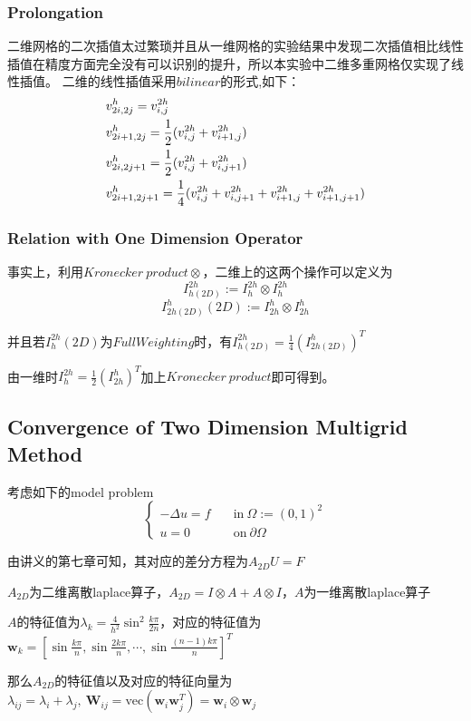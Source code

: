 \documentclass{article}
\begin{document}
\subsubsection{Prolongation}
二维网格的二次插值太过繁琐并且从一维网格的实验结果中发现二次插值相比线性插值在精度方面完全没有可以识别的提升，所以本实验中二维多重网格仅实现了线性插值。
二维的线性插值采用$bilinear$的形式,如下：
\begin{align}
    & v_{2i,2j}^h = v_{i,j}^{2h} \notag \\
    & v_{2i+1,2j}^h=\frac{1}{2}(v_{i,j}^{2h}+v_{i+1,j}^{2h})\notag\\
    & v_{2i,2j+1}^h=\frac{1}{2}(v_{i,j}^{2h}+v_{i,j+1}^{2h})\notag\\
    & v_{2i+1,2j+1}^h=\frac{1}{4}(v_{i,j}^{2h}+v_{i,j+1}^{2h}+v_{i+1,j}^{2h}+v_{i+1,j+1}^{2h})\notag
\end{align}

\subsubsection{Relation with One Dimension Operator}
事实上，利用$Kronecker\ product\otimes$，二维上的这两个操作可以定义为
$$I_{h(2D)}^{2h} := I_h^{2h}\otimes I_h^{2h} $$
$$I_{2h(2D)}^{h}(2D) := I_{2h}^{h}\otimes I_{2h}^{h} $$

并且若$I_h^{2h}(2D)$为$Full Weighting$时，有$I_{h(2D)}^{2h}=\frac{1}{4}(I_{2h(2D)}^{h})^T$

由一维时$I_h^{2h}=\frac{1}{2}(I_{2h}^{h})^T$加上$Kronecker\ product$即可得到。

\subsection{Convergence of Two Dimension Multigrid Method}
考虑如下的model problem
$$
\begin{cases}
    -\Delta u=f\quad &\text{in}\ \Omega:=(0,1)^2\\
    u = 0 & \text{on}\ \partial \Omega
\end{cases}
$$

由讲义的第七章可知，其对应的差分方程为$A_{2D}U=F$

$A_{2D}$为二维离散laplace算子，$A_{2D} = I\otimes A +A\otimes I$，$A$为一维离散laplace算子

$A$的特征值为$\lambda_k = \frac{4}{h^2}\sin^2\frac{k\pi}{2n}$，对应的特征值为$\mathbf{w}_k=[\sin\frac{k\pi}{n},\sin\frac{2k\pi}{n},\cdots,\sin\frac{(n-1)k\pi}{n}]^T$

那么$A_{2D}$的特征值以及对应的特征向量为$\lambda_{ij}=\lambda_i+\lambda_j,\ \mathbf{W}_{ij}=\text{vec}(\mathbf{w}_i\mathbf{w}_j^T)=\mathbf{w}_i\otimes\mathbf{w}_j$
\end{document}
